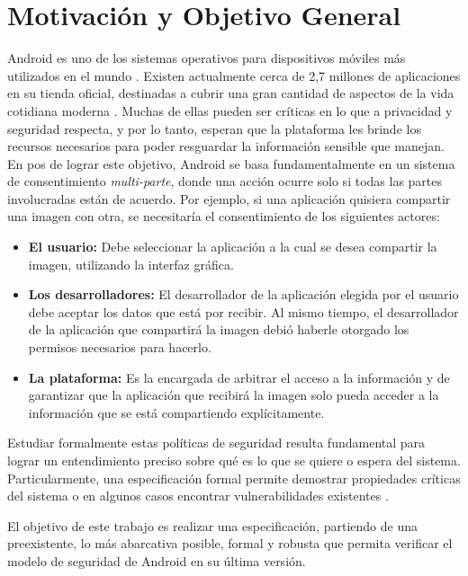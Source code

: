 \section{Motivación y Objetivo General}

Android es uno de los sistemas operativos para dispositivos móviles más
utilizados en el mundo \cite{1,2}. Existen actualmente cerca de 2,7 millones de
aplicaciones en su tienda oficial, destinadas a cubrir una gran cantidad de
aspectos de la vida cotidiana moderna \cite{3}. Muchas de ellas pueden ser críticas
en lo que a privacidad y seguridad respecta, y por lo tanto, esperan que la plataforma
les brinde los recursos necesarios para poder resguardar la información sensible
que manejan.
En pos de lograr este objetivo, Android se basa fundamentalmente en un
sistema de consentimiento \textit{multi-parte}, donde una acción ocurre solo si
todas las partes involucradas están de acuerdo. Por ejemplo, si una aplicación
quisiera compartir una imagen con otra, se necesitaría el consentimiento de los
siguientes actores:

\begin{itemize}
   \item \textbf{El usuario: } Debe seleccionar la aplicación a la cual se desea
   compartir la imagen, utilizando la interfaz gráfica.
   \item \textbf{Los desarrolladores: } El desarrollador de la aplicación
   elegida por el usuario debe aceptar los datos que está por recibir. Al mismo
   tiempo, el desarrollador de la aplicación que compartirá la imagen debió
   haberle otorgado los permisos necesarios para hacerlo.
   \item \textbf{La plataforma: } Es la encargada de arbitrar el acceso a la
   información y de garantizar que la aplicación que recibirá la imagen solo pueda
   acceder a la información que se está compartiendo explícitamente.
\end{itemize}


Estudiar formalmente estas políticas de seguridad resulta fundamental para
lograr un entendimiento preciso sobre qué es lo que se quiere o espera del
sistema. Particularmente, una especificación formal permite demostrar
propiedades críticas del sistema o en algunos casos encontrar vulnerabilidades
existentes \cite{alloy}.

El objetivo de este trabajo es realizar una especificación, partiendo de una
preexistente, lo más abarcativa posible, formal y robusta que permita verificar
el modelo de seguridad de Android en su última versión.
